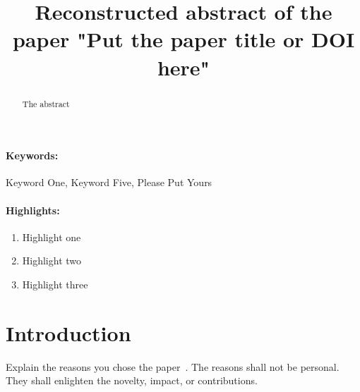 \documentclass[12pt]{article}
\title{Reconstructed abstract of the paper "Put the paper title or DOI here"}
\date{}
\begin{document}
\maketitle

\begin{abstract}
The abstract
\end{abstract}
\paragraph{Keywords:} Keyword One, Keyword Five, Please Put Yours

\paragraph{Highlights:}
\begin{enumerate}
\item Highlight one
\item Highlight two
\item Highlight three
\end{enumerate}

\section{Introduction}
Explain the reasons you chose the paper~\cite{9095246}. The reasons shall not be personal. They shall enlighten the novelty, impact, or contributions.  



\end{document}
